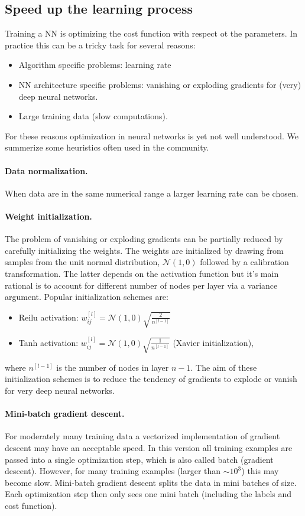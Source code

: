 \documentclass[12pt,a4paper]{article}
\begin{document}
\subsection{Speed up the learning process}
Training a NN is optimizing the cost function with respect ot the parameters. In practice this can be a tricky task for several reasons:
\begin{itemize}\setlength\itemsep{0em}
	\item Algorithm specific problems: learning rate
	\item NN architecture specific problems: vanishing or exploding gradients for (very) deep neural networks.
	\item Large training data (slow computations).
\end{itemize}
For these reasons optimization in neural networks is yet not well understood. We summerize some heuristics often used in the community.

\paragraph{Data normalization.} When data are in the same numerical range a larger learning rate can be chosen. 
\paragraph{Weight initialization.} The problem of vanishing or exploding gradients can be partially reduced by carefully initializing the weights. The weights are initialized by drawing from samples from the unit normal distribution, $\mathcal N(1,0)$ followed by a calibration transformation. The latter depends on the activation function but it's main rational is to account for different number of nodes per layer via a variance argument. Popular initialization schemes are:
\begin{itemize}\setlength\itemsep{0em}
	\item Reilu activation: $w^{[l]}_{ij} = \mathcal N(1,0) \sqrt{\frac{2}{n^{[l-1]}}}$
	\item Tanh activation: $w^{[l]}_{ij} = \mathcal N(1,0) \sqrt{\frac{1}{n^{[l-1]}}}$ (Xavier initialization),
\end{itemize}
where $n^{[l-1]}$ is the number of nodes in layer $n-1$. The aim of these initialization schemes is to reduce the tendency of gradients to explode or vanish for very deep neural networks.

\paragraph{Mini-batch gradient descent.} For moderately many training data a vectorized implementation of gradient descent may have an acceptable speed. In this version all training examples are passed into a single optimization step, which is also called batch (gradient descent). However, for many training examples  (larger than $\sim 10^3$) this may become slow. Mini-batch gradient descent splits the data in mini batches of size. Each optimization step then only sees one mini batch (including the labels and cost function).
\end{document}
